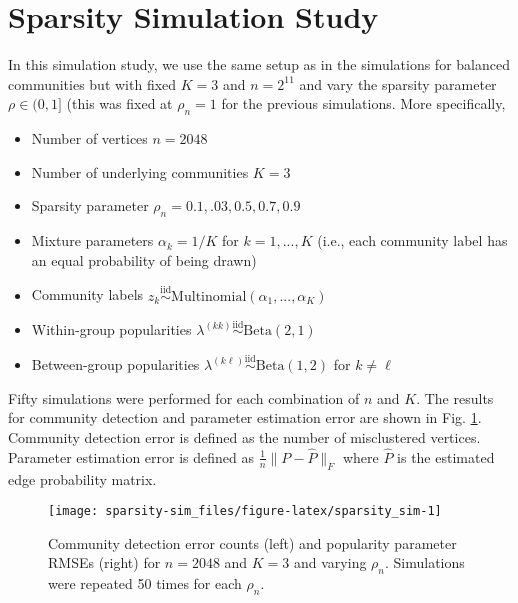 \documentclass[12pt]{article}
\providecommand{\tightlist}{%
  \setlength{\itemsep}{0pt}\setlength{\parskip}{0pt}}
\begin{document}
\hypertarget{sparsity-simulation-study}{%
\section{Sparsity Simulation Study}\label{sparsity-simulation-study}}

In this simulation study, we use the same setup as in the simulations
for balanced communities but with fixed \(K = 3\) and \(n = 2^{11}\) and
vary the sparsity parameter \(\rho \in (0, 1]\) (this was fixed at
\(\rho_n = 1\) for the previous simulations. More specifically,

\begin{itemize}
\tightlist
\item
  Number of vertices \(n = 2048\)
\item
  Number of underlying communities \(K = 3\)
\item
  Sparsity parameter \(\rho_n = 0.1, .03, 0.5, 0.7, 0.9\)
\item
  Mixture parameters \(\alpha_k = 1 / K\) for \(k = 1, ..., K\) (i.e.,
  each community label has an equal probability of being drawn)
\item
  Community labels
  \(z_k \stackrel{\mathrm{iid}}{\sim}\mathrm{Multinomial}(\alpha_1, ..., \alpha_K)\)
\item
  Within-group popularities
  \(\lambda^{(kk)} \stackrel{\mathrm{iid}}{\sim}\mathrm{Beta}(2, 1)\)
\item
  Between-group popularities
  \(\lambda^{(k \ell)} \stackrel{\mathrm{iid}}{\sim}\mathrm{Beta}(1, 2)\)
  for \(k \neq \ell\)
\end{itemize}

Fifty simulations were performed for each combination of \(n\) and
\(K\). The results for community detection and parameter estimation
error are shown in Fig. \ref{fig:sparsity_sim}. Community detection
error is defined as the number of misclustered vertices. Parameter
estimation error is defined as \(\frac{1}{n} \|P - \hat{P}\|_F\) where
\(\hat{P}\) is the estimated edge probability matrix.

\begin{figure}[h]

{\centering \texttt{[image: sparsity-sim\_files/figure-latex/sparsity\_sim-1]} 

}

\caption{Community detection error counts (left) and popularity parameter RMSEs (right) for $n = 2048$ and $K = 3$ and varying $\rho_n$. Simulations were repeated 50 times for each $\rho_n$.}\label{fig:sparsity_sim}
\end{figure}



\end{document}
